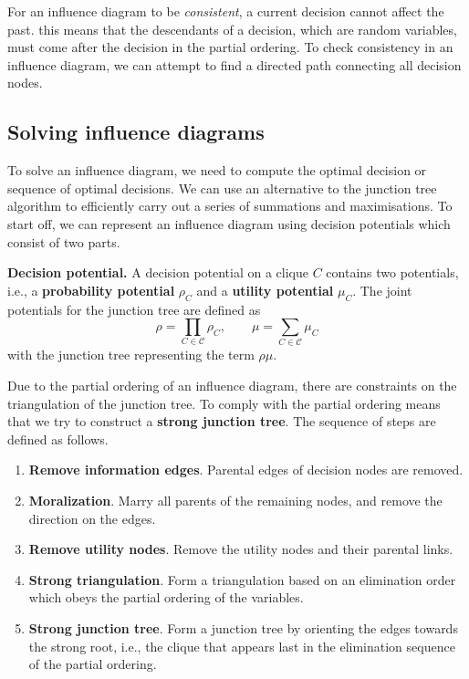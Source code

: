\documentclass{article}
\begin{document}
For an influence diagram to be \textit{consistent}, a current decision cannot affect the past. this means that the descendants of a decision, which are random variables, must come after the decision in the partial ordering. To check consistency in an influence diagram, we can attempt to find a directed path connecting all decision nodes. 


\subsection{Solving influence diagrams}

To solve an influence diagram, we need to compute the optimal decision or sequence of optimal decisions. We can use an alternative to the junction tree algorithm to efficiently carry out a series of summations and maximisations. To start off, we can represent an influence diagram using decision potentials which consist of two parts. 
\\
\begin{theorem}
    \textbf{Decision potential.} A decision potential on a clique $C$ contains two potentials, i.e., a \textbf{probability potential} $\rho_C$ and a \textbf{utility potential} $\mu_C$. The joint potentials for the junction tree are defined as
    $$
        \rho = \prod_{C \in \mathcal{C}} \rho_C, \qquad \mu = \sum_{C \in \mathcal{C}} \mu_C
    $$
    with the junction tree representing the term $\rho \mu$. 
\end{theorem}

\noindent Due to the partial ordering of an influence diagram, there are constraints on the triangulation of the junction tree. To comply with the partial ordering means that we try to construct a \textbf{strong junction tree}. The sequence of steps are defined as follows.
\begin{enumerate}
    \item \textbf{Remove information edges}. Parental edges of decision nodes are removed. 
    \item \textbf{Moralization}. Marry all parents of the remaining nodes, and remove the direction on the edges. 
    \item \textbf{Remove utility nodes}. Remove the utility nodes and their parental links.
    \item \textbf{Strong triangulation}. Form a triangulation based on an elimination order which obeys the partial ordering of the variables. 
    \item \textbf{Strong junction tree}. Form a junction tree by orienting the edges towards the strong root, i.e., the clique that appears last in the elimination sequence of the partial ordering. 
\end{enumerate}
\end{document}
